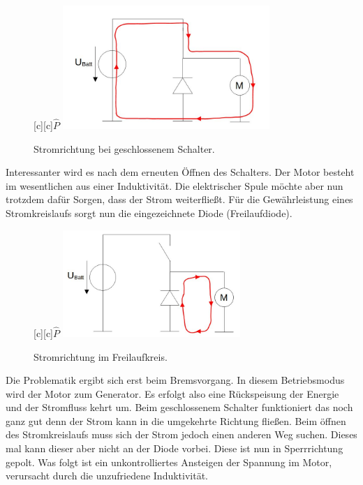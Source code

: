 \begin{figure}[H]
	\renewcommand{\figurename}{Abbildung}
	\centering	
	\psfragscanon		
	[c]{$\hat{P}$}
	\includegraphics[width=0.7\textwidth,angle=0]{Bilder/2.jpg}		
	\caption{Stromrichtung bei geschlossenem Schalter.}
	\label{ME}
\end{figure}

Interessanter wird es nach dem erneuten Öffnen des Schalters. Der Motor besteht im wesentlichen aus einer Induktivität. Die elektrischer Spule möchte aber nun trotzdem dafür Sorgen, dass der Strom weiterfließt. Für die Gewährleistung eines Stromkreislaufs sorgt nun die eingezeichnete Diode (Freilaufdiode).

\begin{figure}[H]
	\renewcommand{\figurename}{Abbildung}
	\centering	
	\psfragscanon		
	[c]{$\hat{P}$}
	\includegraphics[width=0.6\textwidth,angle=0]{Bilder/3.jpg}		
	\caption{Stromrichtung im Freilaufkreis.}
	\label{ME}
\end{figure}
\newpage
Die Problematik ergibt sich erst beim Bremsvorgang. In diesem Betriebsmodus wird der Motor zum Generator. Es erfolgt also eine Rückspeisung der Energie und der Stromfluss kehrt um. Beim geschlossenem Schalter funktioniert das noch ganz gut denn der Strom kann in die umgekehrte Richtung fließen. Beim öffnen des Stromkreislaufs muss sich der Strom jedoch einen anderen Weg suchen. Dieses mal kann dieser aber  nicht an der Diode vorbei. Diese ist nun in Sperrrichtung gepolt. Was folgt ist ein unkontrolliertes Ansteigen der Spannung im Motor, verursacht durch die unzufriedene Induktivität.

